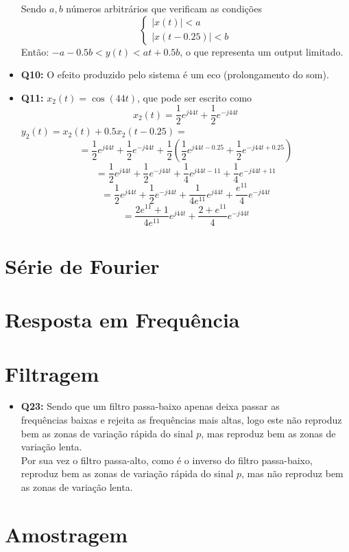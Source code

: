 \documentclass[a4paper, 12pt]{article}
\begin{document}
\begin{itemize}
          Sendo $a, b$ números arbitrários que verificam as condições
          \[\begin{cases}
                  |x(t)| < a \\
                  |x(t - 0.25)| < b
              \end{cases}\]
          Então: $-a - 0.5b < y(t) < at + 0.5b$, o que representa um output limitado.
    \item \textbf{Q10:} O efeito produzido pelo sistema é um eco (prolongamento do som).
    \item \textbf{Q11:} $x_2(t) = \cos(44t)$, que pode ser escrito como
          \[x_2(t) = \frac{1}{2}e^{j44t} + \frac{1}{2}e^{-j44t}\]
          $y_2(t) = x_2(t) + 0.5x_2(t - 0.25) =$
          \[= \frac{1}{2}e^{j44t} + \frac{1}{2}e^{-j44t} + \frac{1}{2}\left(\frac{1}{2}e^{j44t - 0.25}+\frac{1}{2}e^{-j44t + 0.25}\right)\]
          \[= \frac{1}{2}e^{j44t} + \frac{1}{2}e^{-j44t} + \frac{1}{4}e^{j44t - 11} + \frac{1}{4}e^{-j44t + 11}\]
          \[= \frac{1}{2}e^{j44t} + \frac{1}{2}e^{-j44t} + \frac{1}{4e^{11}}e^{j44t} + \frac{e^{11}}{4}e^{-j44t}\]
          \[= \frac{2e^{11} + 1}{4e^{11}}e^{j44t} + \frac{2+e^{11}}{4}e^{-j44t}\]

\end{itemize}
\newpage
\section{Série de Fourier}
\newpage
\section{Resposta em Frequência}
\newpage
\section{Filtragem}
\begin{itemize}
    \item \textbf{Q23:} Sendo que um filtro passa-baixo apenas deixa passar as\\
          frequências baixas e rejeita as frequências mais altas, logo este não reproduz bem as zonas de variação rápida do sinal $p$, mas reproduz bem as zonas de variação lenta.\\
          Por sua vez o filtro passa-alto, como é o inverso do filtro passa-baixo, reproduz bem as zonas de variação rápida do sinal $p$, mas não reproduz bem as zonas de variação lenta.
\end{itemize}
\newpage
\section{Amostragem}
\end{document}
